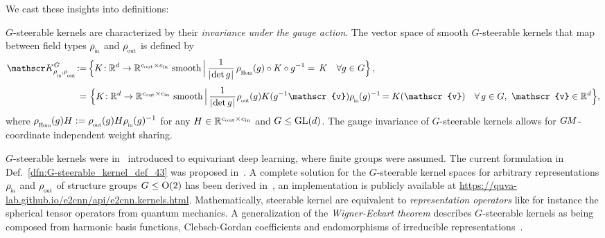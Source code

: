 We cast these insights into definitions:
\begin{dfn}
\label{dfn:G-steerable_kernel_def_43}
    $G$-steerable kernels are characterized by their \emph{invariance under the gauge action}.
    The vector space of smooth $G$-steerable kernels that map between field types $\rhoin$ and $\rhoout$ is defined by
    \begin{align}
        \KG \!:=&\,
        \Big\{ K\!: \R^d \to \R^{\cout\times\cin}\ \text{smooth} \,\Big|\,
        \frac{1}{\detg}\, \rhoHom(g) \circ K \circ g^{-1} =\, K \ \ \ \forall g\in G \Big\} \,,
        \label{eq:G_steerable_space_in_dfn_Hom} \\[1ex]
        =&\ 
        \Big\{ K\!: \R^d \to \R^{\cout\times\cin}\ \text{smooth} \,\Big|\,
        \frac{1}{\detg}\mkern1mu \rhoout(g) K(g^{-1}\mathscr{v}) \rhoin(g)^{-1} \mkern-2mu= K(\mathscr{v}) \ \ \ \forall\, g\in G,\ \mathscr{v} \in \R^d \Big\} ,
        \label{eq:G_steerable_space_in_dfn_classical}
    \end{align}
    where $\rhoHom(g)H := \rhoout(g)H \rhoin(g)^{-1}$ for any $H\in \mathbb{R}^{{c_\textup{out}}\times{c_\textup{in}}}$ and $G\leq\operatorname{GL}(d)$.
    The gauge invariance of $G$-steerable kernels allows for $G\mkern-1.4muM$-coordinate independent weight sharing.
\end{dfn}
$G$-steerable kernels were in~\cite{Cohen2017-STEER} introduced to equivariant deep learning, where finite groups were assumed.
The current formulation in Def.~\ref{dfn:G-steerable_kernel_def_43} was proposed in~\cite{3d_steerableCNNs}.
A complete solution for the $G$-steerable kernel spaces for arbitrary representations $\rhoin$ and $\rhoout$ of structure groups $G\leq\operatorname{O}(2)$ has been derived in~\cite{Weiler2019_E2CNN}, an implementation is publicly available at \url{https://quva-lab.github.io/e2cnn/api/e2cnn.kernels.html}.
Mathematically, steerable kernel are equivalent to \emph{representation operators} like for instance the spherical tensor operators from quantum mechanics.
A generalization of the \emph{Wigner-Eckart theorem} describes $G$-steerable kernels as being composed from harmonic basis functions, Clebsch-Gordan coefficients and endomorphisms of irreducible representations~\cite{lang2020WignerEckart}.



